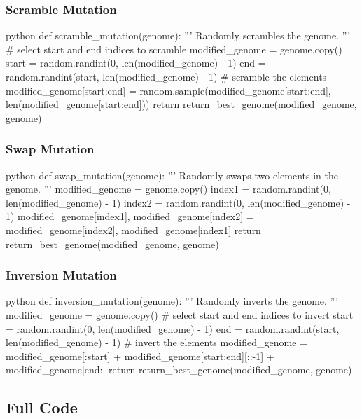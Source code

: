 \subsubsection{Scramble Mutation}

\begin{mintedbox}{python}
def scramble_mutation(genome):
  '''
  Randomly scrambles the genome.
  '''
  # select start and end indices to scramble
  modified_genome = genome.copy()
  start = random.randint(0, len(modified_genome) - 1)
  end = random.randint(start, len(modified_genome) - 1)
  # scramble the elements
  modified_genome[start:end] = random.sample(modified_genome[start:end], len(modified_genome[start:end]))
  return return_best_genome(modified_genome, genome)
\end{mintedbox}

\subsubsection{Swap Mutation}

\begin{mintedbox}{python}
def swap_mutation(genome):
  '''
  Randomly swaps two elements in the genome.
  '''
  modified_genome = genome.copy()
  index1 = random.randint(0, len(modified_genome) - 1)
  index2 = random.randint(0, len(modified_genome) - 1)
  modified_genome[index1], modified_genome[index2] = modified_genome[index2], modified_genome[index1]
  return return_best_genome(modified_genome, genome)
\end{mintedbox}

\subsubsection{Inversion Mutation}

\begin{mintedbox}{python}
def inversion_mutation(genome):
  '''
  Randomly inverts the genome.
  '''
  modified_genome = genome.copy()
  # select start and end indices to invert
  start = random.randint(0, len(modified_genome) - 1)
  end = random.randint(start, len(modified_genome) - 1)
  # invert the elements
  modified_genome = modified_genome[:start] + modified_genome[start:end][::-1] + modified_genome[end:]
  return return_best_genome(modified_genome, genome)
\end{mintedbox}

\subsection{Full Code}

